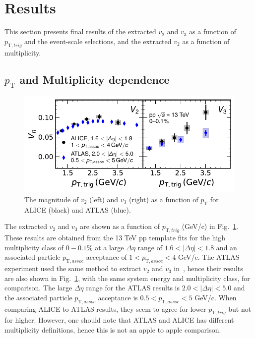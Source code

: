 
\section {Results}
\label{sec:results}
This section presents final results of the extracted $v_2$ and $v_3$ as a function of $p_{\mathrm{T},trig}$ and the event-scale selections, and the extracted $v_2$ as a function of multiplicity. 

\subsection{$p_{\mathrm{T}}$ and Multiplicity dependence}

\begin{figure}[!th]
	\centering
	\includegraphics[width=0.9 \textwidth]{figures/Fig2_vn.pdf} 
	\caption{The magnitude of $v_2$ (left) and $v_3$ (right) as a function of $p_\mathrm{T}$ for ALICE (black) and ATLAS (blue). }
	\label{fig:vn}
\end{figure}

The extracted $v_2$ and $v_3$ are shown as a function of $p_{\mathrm{T},trig}$ (GeV/c) in Fig.~\ref{fig:vn}. These results are obtained from the 13 TeV pp template fits for the high multiplicity class of $0-0.1\%$ at a large $\Delta\eta$ range of $1.6<|\Delta\eta|<1.8$ and an associated particle $p_{\mathrm{T},assoc}$ acceptance of $1<p_{\mathrm{T},assoc}<4$ GeV/c. The ATLAS experiment used the same method to extract $v_2$ and $v_3$ in~\cite{Aaboud:2016yar}, hence their results are also shown in Fig.~\ref{fig:vn}, with the same system energy and multiplicity class, for comparison. The large $\Delta\eta$ range for the ATLAS results is $2.0<|\Delta\eta|<5.0$ and the associated particle $p_{\mathrm{T},assoc}$ acceptance is $0.5<p_{\mathrm{T},assoc}<5$ GeV/c. When comparing ALICE to ATLAS results, they seem to agree for lower $p_{\mathrm{T},trig}$ but not for higher. However, one should note that ATLAS and ALICE has different multiplicity definitions, hence this is not an apple to apple comparison. 


